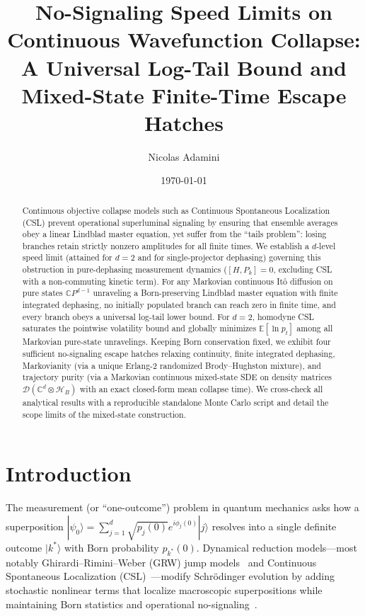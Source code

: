 \documentclass[aps,pra,10pt,twocolumn,superscriptaddress,amsmath,amssymb,floatfix]{revtex4-2}
\newcommand{\E}{\mathbb{E}}
\newcommand{\ket}[1]{|#1\rangle}
\begin{document}
\title{No-Signaling Speed Limits on Continuous Wavefunction Collapse:\\
A Universal Log-Tail Bound and Mixed-State Finite-Time Escape Hatches}

\author{Nicolas Adamini}
\date{\today}

\begin{abstract}
Continuous objective collapse models such as Continuous Spontaneous Localization (CSL) prevent operational superluminal signaling by ensuring that ensemble averages obey a linear Lindblad master equation, yet suffer from the ``tails problem'': losing branches retain strictly nonzero amplitudes for all finite times. We establish a $d$-level speed limit (attained for $d=2$ and for single-projector dephasing) governing this obstruction in pure-dephasing measurement dynamics ($[H,P_k]=0$, excluding CSL with a non-commuting kinetic term). For any Markovian continuous It\^o diffusion on pure states $\mathbb{C}P^{d-1}$ unraveling a Born-preserving Lindblad master equation with finite integrated dephasing, no initially populated branch can reach zero in finite time, and every branch obeys a universal log-tail lower bound. For $d=2$, homodyne CSL saturates the pointwise volatility bound and globally minimizes $\E[\ln p_t]$ among all Markovian pure-state unravelings. Keeping Born conservation fixed, we exhibit four sufficient no-signaling escape hatches relaxing continuity, finite integrated dephasing, Markovianity (via a unique Erlang-2 randomized Brody--Hughston mixture), and trajectory purity (via a Markovian continuous mixed-state SDE on density matrices $\mathcal{D}(\mathbb{C}^d \otimes \mathcal{H}_B)$ with an exact closed-form mean collapse time). We cross-check all analytical results with a reproducible standalone Monte Carlo script and detail the scope limits of the mixed-state construction.
\end{abstract}

\maketitle

\section{Introduction}
\label{sec:intro}

The measurement (or ``one-outcome'') problem in quantum mechanics asks how a superposition $\ket{\psi_0} = \sum_{j=1}^d \sqrt{p_j(0)} e^{i\phi_j(0)} \ket{j}$ resolves into a single definite outcome $\ket{k^*}$ with Born probability $p_{k^*}(0)$. Dynamical reduction models---most notably Ghirardi--Rimini--Weber (GRW) jump models~\cite{GRW1986} and Continuous Spontaneous Localization (CSL)~\cite{Pearle1989,GPR1990,BassiGhirardi2003,Bassi2013}---modify Schr\"odinger evolution by adding stochastic nonlinear terms that localize macroscopic superpositions while maintaining Born statistics and operational no-signaling~\cite{Gisin1984,Gisin1989,HJW1993}.
\end{document}
